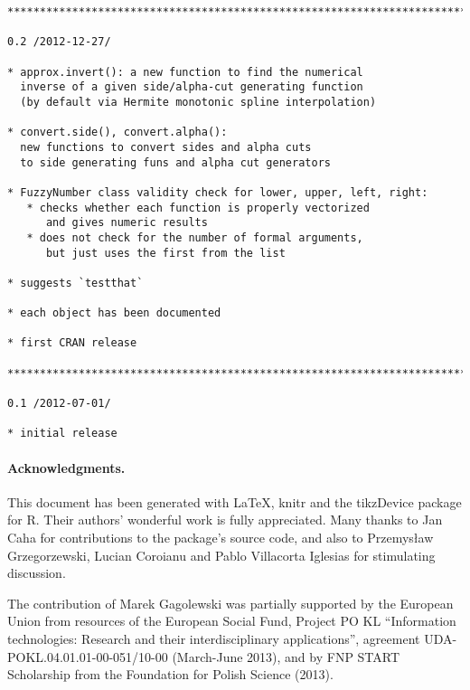 \documentclass[11pt]{article}\usepackage{graphicx, color}
\makeatletter
\newenvironment{kframe}{%
 \def\at@end@of@kframe{}%
 \ifinner\ifhmode%
  \def\at@end@of@kframe{\end{minipage}}%
  \begin{minipage}{\columnwidth}%
 \fi\fi%
 \def\FrameCommand##1{\hskip\@totalleftmargin \hskip-\fboxsep
 \colorbox{shadecolor}{##1}\hskip-\fboxsep
     \hskip-\linewidth \hskip-\@totalleftmargin \hskip\columnwidth}%
 \MakeFramed {\advance\hsize-\width
   \@totalleftmargin\z@ \linewidth\hsize
   \@setminipage}}%
 {\par\unskip\endMakeFramed%
 \at@end@of@kframe}
\newenvironment{knitrout}{}{} %
\newcommand{\package}[1]{\textsf{#1}\xspace}
\newcommand{\lang}[1]{\textsf{#1}\xspace}
\newcommand{\R}{\lang{R}}
\makeatother
\begin{document}
\begin{knitrout}
\begin{kframe}
\begin{verbatim}
***************************************************************************

0.2 /2012-12-27/

* approx.invert(): a new function to find the numerical
  inverse of a given side/alpha-cut generating function
  (by default via Hermite monotonic spline interpolation)

* convert.side(), convert.alpha():
  new functions to convert sides and alpha cuts
  to side generating funs and alpha cut generators

* FuzzyNumber class validity check for lower, upper, left, right:
   * checks whether each function is properly vectorized
      and gives numeric results
   * does not check for the number of formal arguments,
      but just uses the first from the list

* suggests `testthat`

* each object has been documented

* first CRAN release

***************************************************************************

0.1 /2012-07-01/

* initial release
\end{verbatim}
\end{kframe}
\end{knitrout}



\paragraph{Acknowledgments.}
This document has been generated with \LaTeX, \package{knitr} and
the \package{tikzDevice} package for \R.
Their authors' wonderful work is fully appreciated.
Many thanks to Jan Caha for contributions to the package's source code,
and also to Przemys\l{}aw Grzegorzewski, Lucian Coroianu
and Pablo Villacorta Iglesias for stimulating discussion.



The contribution of Marek Gagolewski was partially supported
by the European Union from resources of the European Social Fund, Project PO KL 
``Information technologies: Research and their interdisciplinary
applications'', agreement UDA-POKL.04.01.01-00-051/10-00 (March-June 2013),
and by FNP START Scholarship from the Foundation for Polish Science (2013).






\end{document}
